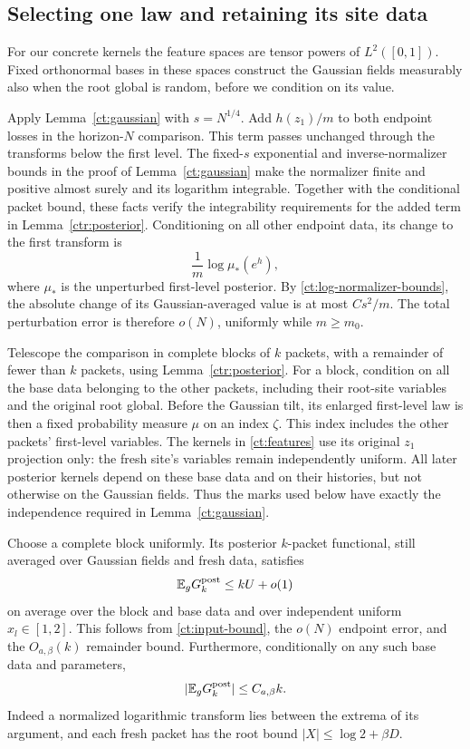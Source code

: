 \subsection{Selecting one law and retaining its site data}\label{ct:sub-selection}

For our concrete kernels the feature spaces are tensor powers of
$L^2([0,1])$.  Fixed orthonormal bases in these spaces construct the
Gaussian fields measurably also when the root global is random, before
we condition on its value.

Apply Lemma~\ref{ct:gaussian} with $s=N^{1/4}$.  Add $h(z_1)/m$
to both endpoint losses in the horizon-$N$ comparison.  This term
passes unchanged through the transforms below the first level.
The fixed-$s$ exponential and inverse-normalizer bounds in the proof of
Lemma~\ref{ct:gaussian} make the normalizer finite and positive almost
surely and its logarithm integrable.  Together with the conditional packet
bound, these facts verify the integrability requirements for the added
term in Lemma~\ref{ctr:posterior}.
Conditioning on all other endpoint data, its change to the first
transform is
\[
                     \frac1m\log\mu_*(e^h),
\]
where $\mu_*$ is the unperturbed first-level posterior.  By
\eqref{ct:log-normalizer-bounds}, the absolute change of its
Gaussian-averaged value is at
most $Cs^2/m$.  The total perturbation error is therefore $o(N)$,
uniformly while $m\ge m_0$.

Telescope the comparison in complete blocks of $k$ packets, with a
remainder of fewer than $k$ packets, using
Lemma~\ref{ctr:posterior}.  For a block, condition on all the
base data belonging to the other packets, including their root-site
variables and the original root global.  Before the Gaussian tilt,
its enlarged first-level law is then a fixed probability measure
$\mu$ on an index $\zeta$.  This index includes the other packets'
first-level variables.  The kernels in \eqref{ct:features} use its
original $z_1$ projection only: the fresh site's variables remain
independently uniform.  All later posterior kernels depend on these
base data and on their histories, but not otherwise on the Gaussian
fields.  Thus the marks used below have exactly the independence
required in Lemma~\ref{ct:gaussian}.

Choose a complete block uniformly.  Its posterior $k$-packet
functional, still averaged over Gaussian fields and fresh data,
satisfies
\begin{equation}\label{ct:selected-value}
                      \mathbb E_g G_k^{\rm post}\le kU+o(1)
\end{equation}
on average over the block and base data and over independent uniform
$x_l\in[1,2]$.  This follows from \eqref{ct:input-bound}, the
$o(N)$ endpoint error, and the $O_{a,\beta}(k)$ remainder bound.
Furthermore, conditionally on any such base data and parameters,
\begin{equation}\label{ct:conditional-value-bound}
                    |\mathbb E_g G_k^{\rm post}|\le C_{a,\beta}k.
\end{equation}
Indeed a normalized logarithmic transform lies between the extrema
of its argument, and each fresh packet has the root bound
$|X|\le\log2+\beta D$.

